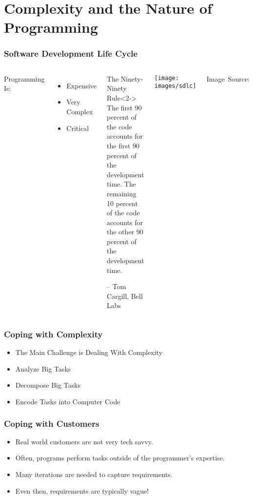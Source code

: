 \documentclass[handout]{beamer}
\newcommand{\imagesource}[1]{{\centering\hfill\break\hbox{\scriptsize Image Source:\thinspace{\small\itshape wikipedia.org}}\par}}
\begin{document}
\section{Complexity and the Nature of Programming}
\begin{frame}
   \frametitle{Software Development Life Cycle}
   \begin{columns}
   Programming Is:
   \begin{itemize}
   \item Expensive
   \item Very Complex
   \item Critical
   \end{itemize}
   
   \begin{block}{The Ninety-Ninety Rule}<2->
    The first 90 percent of the code accounts for the first 90 percent of the development time. The remaining 10 percent of the code accounts for the other 90 percent of the development time.
    
    -- Tom Cargill, Bell Labs
   \end{block} 
   
   \texttt{[image: images/sdlc]}
   \imagesource{wikipedia.org}
   \end{columns}
\end{frame}

\begin{frame}
   \frametitle{Coping with Complexity}
   \begin{itemize}
   \item<1-> The Main Challenge is Dealing With Complexity
   \item<2-> Analyze Big Tasks
   \item<3-> Decompose Big Tasks
   \item<4-> Encode Tasks into Computer Code
   \end{itemize}
\end{frame}

\begin{frame}
   \frametitle{Coping with Customers}
   \begin{itemize}
   \item<2-> Real world customers are not very tech savvy.
   \item<3-> Often, programs perform tasks outside of the programmer's expertise.
   \item<4-> Many iterations are needed to capture requirements.
   \item<5-> Even then, requirements are typically vague!
   \end{itemize}
\end{frame}
\end{document}
